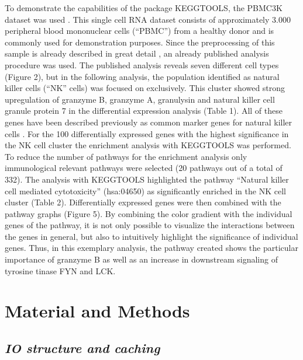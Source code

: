 \documentclass[11pt,a4paper]{article}
\begin{document}
To demonstrate the capabilities of the package KEGGTOOLS, the PBMC3K dataset was
used \cite{pbmc3k}. This single cell RNA dataset consists of approximately 3.000 peripheral
blood mononuclear cells (“PBMC”) from a healthy donor and is commonly used for demonstration purposes.
Since the preprocessing of this sample is already described in great detail \cite{seurat,scanpy},
an already published analysis procedure was used. The published analysis reveals seven
different cell types (Figure 2), but in the following analysis, the population identified
as natural killer cells (“NK” cells) was focused on exclusively. This cluster showed
strong upregulation of granzyme B, granzyme A, granulysin and natural killer cell granule
protein 7 in the differential expression analysis (Table 1). All of these genes have
been described previously as common marker genes for natural killer cells \cite{nk-marker-1,nk-marker-2,nk-marker-3}.
For the 100 differentially expressed genes with the highest significance in the NK cell
cluster the enrichment analysis with KEGGTOOLS was performed. To reduce the number of
pathways for the enrichment analysis only immunological relevant pathways were selected (20 pathways out of a total of 332).
The analysis with KEGGTOOLS highlighted the pathway “Natural killer cell mediated cytotoxicity”
(hsa:04650) as significantly enriched in the NK cell cluster (Table 2). Differentially expressed genes were then
combined with the pathway graphs (Figure 5). By combining the color gradient with the
individual genes of the pathway, it is not only possible to visualize the interactions
between the genes in general, but also to intuitively highlight the significance of
individual genes. Thus, in this exemplary analysis, the pathway created shows the particular
importance of granzyme B as well as an increase in downstream signaling of tyrosine
tinase FYN and LCK.


\section*{Material and Methods}


\subsection*{\textit{IO structure and caching}}
\end{document}
